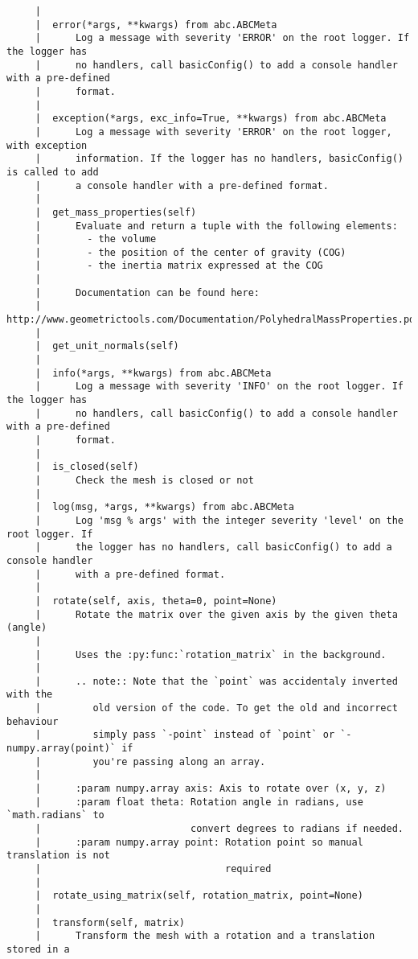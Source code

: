 \documentclass[12pt,fleqn]{article}\usepackage{../../common}
\begin{document}
\begin{verbatim}
     |  
     |  error(*args, **kwargs) from abc.ABCMeta
     |      Log a message with severity 'ERROR' on the root logger. If the logger has
     |      no handlers, call basicConfig() to add a console handler with a pre-defined
     |      format.
     |  
     |  exception(*args, exc_info=True, **kwargs) from abc.ABCMeta
     |      Log a message with severity 'ERROR' on the root logger, with exception
     |      information. If the logger has no handlers, basicConfig() is called to add
     |      a console handler with a pre-defined format.
     |  
     |  get_mass_properties(self)
     |      Evaluate and return a tuple with the following elements:
     |        - the volume
     |        - the position of the center of gravity (COG)
     |        - the inertia matrix expressed at the COG
     |      
     |      Documentation can be found here:
     |      http://www.geometrictools.com/Documentation/PolyhedralMassProperties.pdf
     |  
     |  get_unit_normals(self)
     |  
     |  info(*args, **kwargs) from abc.ABCMeta
     |      Log a message with severity 'INFO' on the root logger. If the logger has
     |      no handlers, call basicConfig() to add a console handler with a pre-defined
     |      format.
     |  
     |  is_closed(self)
     |      Check the mesh is closed or not
     |  
     |  log(msg, *args, **kwargs) from abc.ABCMeta
     |      Log 'msg % args' with the integer severity 'level' on the root logger. If
     |      the logger has no handlers, call basicConfig() to add a console handler
     |      with a pre-defined format.
     |  
     |  rotate(self, axis, theta=0, point=None)
     |      Rotate the matrix over the given axis by the given theta (angle)
     |      
     |      Uses the :py:func:`rotation_matrix` in the background.
     |      
     |      .. note:: Note that the `point` was accidentaly inverted with the
     |         old version of the code. To get the old and incorrect behaviour
     |         simply pass `-point` instead of `point` or `-numpy.array(point)` if
     |         you're passing along an array.
     |      
     |      :param numpy.array axis: Axis to rotate over (x, y, z)
     |      :param float theta: Rotation angle in radians, use `math.radians` to
     |                          convert degrees to radians if needed.
     |      :param numpy.array point: Rotation point so manual translation is not
     |                                required
     |  
     |  rotate_using_matrix(self, rotation_matrix, point=None)
     |  
     |  transform(self, matrix)
     |      Transform the mesh with a rotation and a translation stored in a

\end{verbatim}
\end{document}
